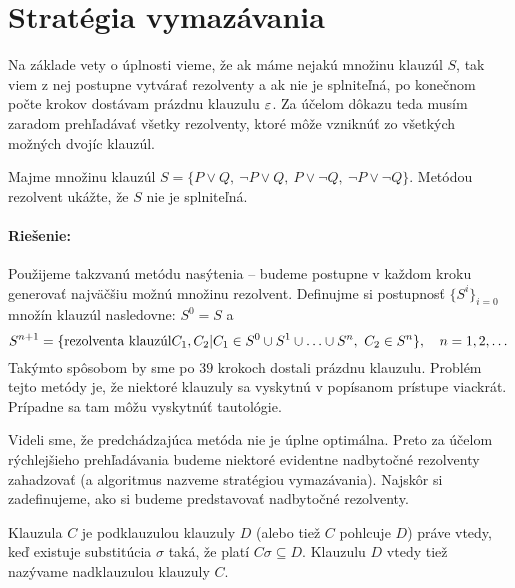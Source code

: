 \section{Stratégia vymazávania}

Na základe vety o úplnosti vieme, že ak máme nejakú množinu klauzúl $S$,
tak viem z nej postupne vytvárať rezolventy a ak nie je splniteľná, 
po konečnom počte krokov dostávam prázdnu klauzulu $\varepsilon$.
Za účelom dôkazu teda musím zaradom prehľadávať všetky rezolventy, ktoré
môže vzniknúť zo všetkých možných dvojíc klauzúl.

\begin{priklad}
    \label{prikl:vymazavanie}
    Majme množinu klauzúl $S=\{P\lor Q,\ \neg P\lor Q,\ 
        P \lor \neg Q,\ \neg P \lor \neg Q\}$. 
    Metódou rezolvent ukážte, že $S$ nie je splniteľná.

    \paragraph{Riešenie:}
    Použijeme takzvanú metódu nasýtenia -- budeme postupne 
    v každom kroku generovať najväčšiu možnú množinu rezolvent.
    Definujme si postupnosť $\{S^i\}_{i=0}$ množín klauzúl nasledovne:
    $S^0 = S$ a
    \begin{equation*}
        S^{n+1} = \{ \mbox{rezolventa klauzúl} C_1, C_2 | 
            C_1 \in S^0 \union S^1 \union \dots \union S^{n},\
            C_2 \in S^n\},\quad n=1, 2, \dots
    \end{equation*}
    Takýmto spôsobom by sme po $39$ krokoch dostali prázdnu klauzulu.
    Problém tejto metódy je, že niektoré klauzuly sa vyskytnú v
    popísanom prístupe viackrát. Prípadne sa tam môžu vyskytnúť tautológie.
\end{priklad}

Videli sme, že predchádzajúca metóda nie je úplne optimálna. Preto za
účelom rýchlejšieho prehľadávania budeme niektoré evidentne nadbytočné
rezolventy zahadzovať (a algoritmus nazveme stratégiou vymazávania).
Najskôr si zadefinujeme, ako si budeme predstavovať nadbytočné rezolventy.

\begin{definicia}[podklauzula]
    Klauzula $C$ je podklauzulou klauzuly $D$ (alebo tiež $C$ pohlcuje
    $D$) práve vtedy, keď existuje substitúcia $\sigma$ taká, že platí $C\sigma
    \subseteq D$. Klauzulu $D$ vtedy tiež nazývame nadklauzulou klauzuly $C$.
\end{definicia}

